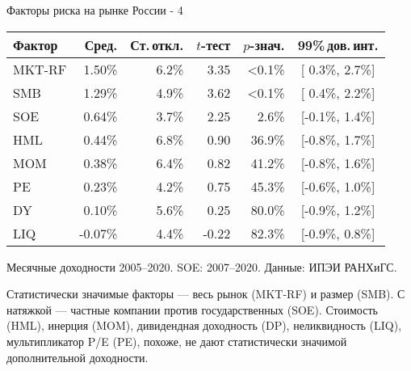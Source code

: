 \documentclass{beamer}
\begin{document}
\begin{frame}{Факторы риска на рынке России - 4}
\centering
\begin{tabular}{l|r|r|r|r|c}
Фактор & Сред. & Ст.\,откл. & $t$-тест & $p$-знач. & 99\%\,дов.\,инт. \\
\hline
MKT-RF &  1.50\% & 6.2\% &  3.35 & <0.1\% & [ 0.3\%, 2.7\%] \\
SMB    &  1.29\% & 4.9\% &  3.62 & <0.1\% & [ 0.4\%, 2.2\%] \\ 
SOE    &  0.64\% & 3.7\% &  2.25 &  2.6\% & [-0.1\%, 1.4\%] \\
HML    &  0.44\% & 6.8\% &  0.90 & 36.9\% & [-0.8\%, 1.7\%] \\
MOM    &  0.38\% & 6.4\% &  0.82 & 41.2\% & [-0.8\%, 1.6\%] \\  
PE     &  0.23\% & 4.2\% &  0.75 & 45.3\% & [-0.6\%, 1.0\%] \\
DY     &  0.10\% & 5.6\% &  0.25 & 80.0\% & [-0.9\%, 1.2\%] \\
LIQ    & -0.07\% & 4.4\% & -0.22 & 82.3\% & [-0.9\%, 0.8\%] \\ \hline
\end{tabular}

\centering
{\scriptsize Месячные доходности 2005--2020. SOE: 2007--2020. Данные: ИПЭИ РАНХиГС.}

\justify
Статистически значимые факторы --- весь рынок (MKT-RF) и размер (SMB). С натяжкой ---  частные компании против государственных (SOE). Стоимость (HML), инерция (MOM), дивидендная доходность (DP), неликвидность (LIQ), мультипликатор P/E (PE), похоже, не дают статистически значимой дополнительной доходности.
\end{frame}
\end{document}

